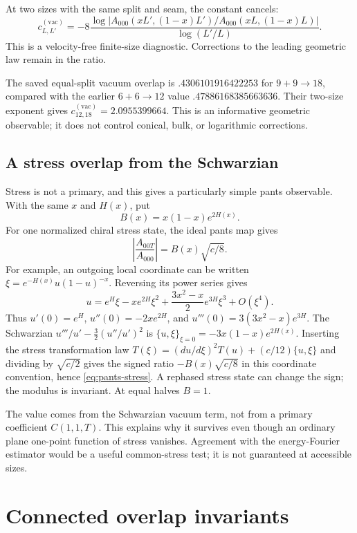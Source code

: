 At two sizes with the same split and seam, the constant cancels:
\[
 c^{(\mathrm{vac})}_{L,L'}
 =-8\frac{\log|A_{000}(xL',(1-x)L')/A_{000}(xL,(1-x)L)|}
          {\log(L'/L)}.
\]
This is a velocity-free finite-size diagnostic. Corrections to the
leading geometric law remain in the ratio.

The saved equal-split vacuum overlap is $.4306101916422253$ for
$9+9\to18$, compared with the earlier $6+6\to12$ value
$.47886168385663636$. Their two-size exponent gives
$c^{(\mathrm{vac})}_{12,18}=2.0955399664$. This is an informative geometric observable;
it does not control conical, bulk, or logarithmic corrections.

\subsection{A stress overlap from the Schwarzian}

Stress is not a primary, and this gives a particularly simple pants
observable. With the same $x$ and $H(x)$, put
\[
 B(x)=x(1-x)e^{2H(x)}.
\]
For one normalized chiral stress state, the ideal pants map gives
\begin{equation}
 \left|\frac{A_{00T}}{A_{000}}\right|
       =B(x)\sqrt{c/8}.
 \label{eq:pants-stress}
\end{equation}
For example, an outgoing local coordinate can be written
$\xi=e^{-H(x)}u(1-u)^{-x}$. Reversing its power series gives
\[
 u=e^H\xi-xe^{2H}\xi^2+\frac{3x^2-x}{2}e^{3H}\xi^3
       +O(\xi^4).
\]
Thus $u'(0)=e^H$, $u''(0)=-2xe^{2H}$, and
$u'''(0)=3(3x^2-x)e^{3H}$. The Schwarzian
$u'''/u'-\tfrac32(u''/u')^2$ is
$\{u,\xi\}_{\xi=0}=-3x(1-x)e^{2H(x)}$. Inserting the stress
transformation law $T(\xi)=(du/d\xi)^2T(u)+(c/12)\{u,\xi\}$ and
dividing by $\sqrt{c/2}$ gives the signed ratio
$-B(x)\sqrt{c/8}$ in this coordinate convention, hence
\eqref{eq:pants-stress}. A rephased stress state can change the
sign; the modulus is invariant. At equal halves $B=1$.

The value comes from the Schwarzian vacuum term, not from a primary
coefficient $C(1,1,T)$. This explains why it survives even though an
ordinary plane one-point function of stress vanishes. Agreement with
the energy-Fourier estimator would be a useful common-stress test;
it is not guaranteed at accessible sizes.

\section{Connected overlap invariants}

